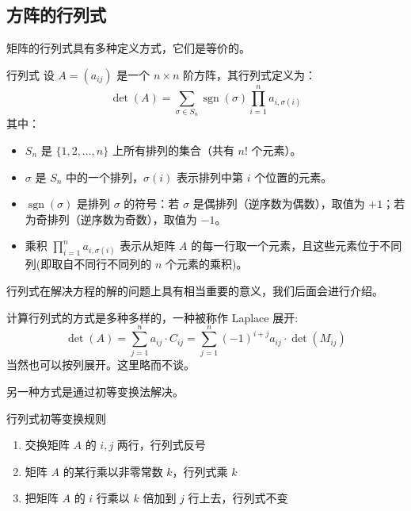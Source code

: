 \documentclass[a4paper,12pt]{ctexart}
\begin{document}
\newpage

\subsection{方阵的行列式}
矩阵的行列式具有多种定义方式，它们是等价的。

\begin{mydef}{行列式}{}
        设 $A = (a_{ij})$ 是一个 $n \times n$ 阶方阵，其行列式定义为：
        \[
        \det(A) = \sum_{\sigma \in S_n} \operatorname{sgn}(\sigma) \prod_{i=1}^n a_{i,\sigma(i)}
        \]
        其中：
        \begin{itemize}
            \item $S_n$ 是 $\{1, 2, \dots, n\}$ 上所有排列的集合（共有 $n!$ 个元素）。
            \item $\sigma$ 是 $S_n$ 中的一个排列，$\sigma(i)$ 表示排列中第 $i$ 个位置的元素。
            \item $\operatorname{sgn}(\sigma)$ 是排列 $\sigma$ 的符号：若 $\sigma$ 是偶排列（逆序数为偶数），取值为 $+1$；若为奇排列（逆序数为奇数），取值为 $-1$。
            \item 乘积 $\prod_{i=1}^n a_{i,\sigma(i)}$ 表示从矩阵 $A$ 的每一行取一个元素，且这些元素位于不同列(即取自不同行不同列的 $n$ 个元素的乘积)。
        \end{itemize}
    \end{mydef}
        
        行列式在解决方程的解的问题上具有相当重要的意义，我们后面会进行介绍。
        
        计算行列式的方式是多种多样的，一种被称作 Laplace 展开:
        \[
        \det(A) = \sum_{j=1}^{n} a_{ij} \cdot C_{ij} = \sum_{j=1}^{n} (-1)^{i+j} a_{ij} \cdot \det(M_{ij})
        \]
        当然也可以按列展开。这里略而不谈。
        
        另一种方式是通过初等变换法解决。
        
        \begin{myprop}{行列式初等变换规则}{}
        \begin{enumerate}
            \item 交换矩阵 $A$ 的 $i,j$ 两行，行列式反号
            \item 矩阵 $A$ 的某行乘以非零常数 $k$，行列式乘 $k$
            \item 把矩阵 $A$ 的 $i$ 行乘以 $k$ 倍加到 $j$ 行上去，行列式不变
        \end{enumerate}
        \end{myprop}
\end{document}
